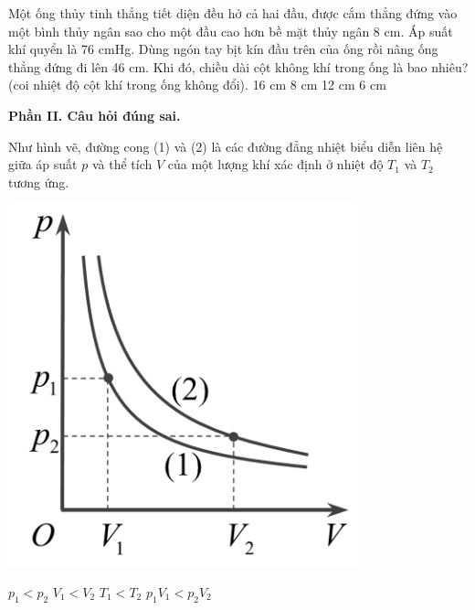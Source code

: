 \documentclass[12pt,a4paper]{article}
\begin{document}
\begin{ex}
	Một ống thủy tinh thẳng tiết diện đều hở cả hai đầu, được cắm thẳng đứng vào một bình thủy ngân sao cho một đầu cao hơn bề mặt thủy ngân 8 cm. Áp suất khí quyển là 76 cmHg. Dùng ngón tay bịt kín đầu trên của ống rồi nâng ống thẳng đứng đi lên 46 cm. Khi đó, chiều dài cột không khí trong ống là bao nhiêu? (coi nhiệt độ cột khí trong ống không đổi).
	\choice
	{16 cm}
	{8 cm}
	{12 cm}
	{6 cm}
\end{ex}

\textbf{Phần II. Câu hỏi đúng sai.}
\setcounter{ex}{0}
\begin{ex}
	Như hình vẽ, đường cong (1) và (2) là các đường đẳng nhiệt biểu diễn liên hệ giữa áp suất $p$ và thể tích $V$ của một lượng khí xác định ở nhiệt độ $T_1$ và $T_2$ tương ứng.
		\begin{center}
		\includegraphics[scale=0.4]{img/9.png}
	\end{center}
	\choiceTF
	{$p_1 < p_2$}
	{$V_1 < V_2$}
	{$T_1 < T_2$}
	{$p_1V_1 < p_2V_2$}
 
\end{ex}
\end{document}
